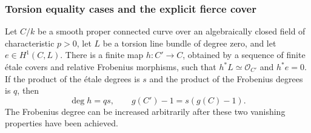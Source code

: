 \subsubsection{Torsion equality cases and the explicit fierce cover}

\begin{lemma}
\label{D:torsion-first-obstruction-cover}
Let $C/k$ be a smooth proper connected curve over an
algebraically closed field of characteristic $p>0$, let
$L$ be a torsion line bundle of degree zero, and let
$e\in H^1(C,L)$.  There is a finite map $h:C'\to C$,
obtained by a sequence of finite \'etale covers and relative
Frobenius morphisms, such that $h^*L\simeq\mathcal O_{C'}$
and $h^*e=0$.  If the product of the \'etale degrees is $s$
and the product of the Frobenius degrees is $q$, then
\[
             \deg h=qs,\qquad g(C')-1=s(g(C)-1).
\]
The Frobenius degree can be increased arbitrarily after
these two vanishing properties have been achieved.
\end{lemma}

